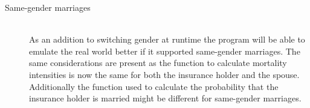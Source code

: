 \begin{description}
\item[Same-gender marriages] \hfill \\
As an addition to switching gender at runtime the program will be able to emulate the real world better if it supported same-gender marriages. The same considerations are present as the function to calculate mortality intensities is now the same for both the insurance holder and the spouse. Additionally the function used to calculate the probability that the insurance holder is married might be different for same-gender marriages.

\end{description}
